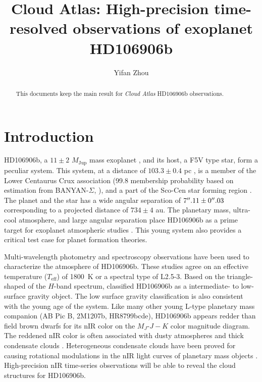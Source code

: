 \documentclass[twocolumn]{aastex62}
\newcommand{\mjup}{\ensuremath{M_\mathrm{Jup}}\xspace}
\newcommand{\teff}{\ensuremath{T_{\mathrm{eff}}}\xspace}
\begin{document}
\title{Cloud Atlas: High-precision time-resolved observations of exoplanet HD106906b}


\author{Yifan Zhou}

\begin{abstract}
  This documents keep the main result for \emph{Cloud Atlas} HD106906b \citep{Bailey2013} observations.
\end{abstract}

\keywords{}
\listoftodos

\section{Introduction}

HD106906b, a $11\pm2$ \mjup  mass exoplanet \citep{Bailey2013}, and its host, a F5V type star, form a peculiar system. This system, at a distance of $103.3\pm0.4$ pc \citep{Gaia2016,Gaia2018}, is a member of the Lower Centaurus Crux association (99.8 membership probability based on estimation from BANYAN-$\Sigma$, \citealt{Gagne2018} ), and a part of the Sco-Cen star forming region \citep[average age: $15\pm3$ Myr][]{Pecaut2016}. The planet and the star has a wide angular separation of $7\mbox{$^{\prime\prime}$}.11\pm0\mbox{$^{\prime\prime}$}.03$ corresponding to a projected distance of $734\pm4$ au. The planetary mass, ultra-cool atmosphere, and large angular separation place HD106906b as a prime target for exoplanet atmospheric studies \citep{Bailey2013,Kalas2015,Wu2016,Daemgen2017}. This young system also provides a critical test case for planet formation theories.

Multi-wavelength photometry \citep{Bailey2013,Kalas2015,Wu2016} and spectroscopy \citep{Daemgen2017} observations have been used to characterize the atmosphere of HD106906b.  These studies agree on an effective temperature (\teff) of 1800~K or a spectral type of L2.5-3. Based on the triangle-shaped of the $H$-band spectrum, \citet{Bailey2013, Daemgen2017} classified HD106906b as a intermediate- to low-surface gravity object. The low surface gravity classification is also consistent with the young age of the system. Like many other young L-type planetary mass companion (AB Pic B, 2M1207b, HR8799bcde), HD106906b appears redder than field brown dwarfs for its nIR color on the $M_{J}$-$J-K$ color magnitude diagram. The reddened nIR color is often associated with dusty atmospheres and thick condensate clouds \citep[e.g.,][]{Skemer2011}. Heterogeneous condensate clouds have been proved for causing rotational modulations in the nIR light curves of planetary mass objects \citep[e.g.,][]{Zhou2016,Vos2017,Biller2017,Biller2015,Lew2016,Manjavacas2017,Zhou2019}. High-precision nIR time-series observations will be able to reveal the cloud structures for HD106906b.
\end{document}
